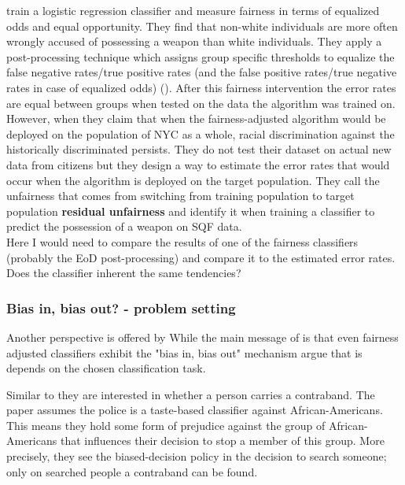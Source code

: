 \cite{kallus2018} train a logistic regression classifier and measure fairness in terms of equalized odds and equal opportunity. They find that non-white individuals are more often wrongly accused of possessing a weapon than white individuals. They apply a post-processing technique which assigns group specific thresholds to equalize the false negative rates/true positive rates (and the false positive rates/true negative rates in case of equalized odds) (\cite{hardt2016}).
After this fairness intervention the error rates are equal between groups when tested on the data the algorithm was trained on. However, when they claim that when the fairness-adjusted algorithm would be deployed on the population of NYC as a whole, racial discrimination against the historically discriminated persists. They do not test their dataset on actual new data from citizens but they design a way to estimate the error rates that would occur when the algorithm is deployed on the target population. They call the unfairness that comes from switching from training population to target population \textbf{residual unfairness} and identify it when training a classifier to predict the possession of a weapon on SQF data.\\
Here I would need to compare the results of one of the fairness classifiers (probably the EoD post-processing) and compare it to the estimated error rates. Does the classifier inherent the same tendencies?

\subsubsection*{Bias in, bias out? - problem setting}

Another perspective is offered by \cite{RambachanBBOEFW}
While the main message of \cite{kallus2018} is that even fairness adjusted classifiers exhibit the "bias in, bias out" mechanism \cite{RambachanBBOEFW} argue that is depends on the chosen classification task.

Similar to \cite{kallus2018} they are interested in whether a person carries a contraband. The paper assumes the police is a taste-based classifier against African-Americans. This means they hold some form of prejudice against the group of African-Americans that influences their decision to stop a member of this group. More precisely, they see the biased-decision policy in the decision to search someone; only on searched people a contraband can be found.\\

